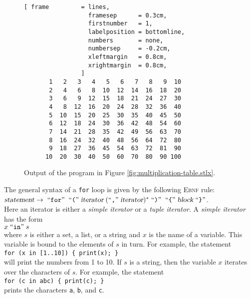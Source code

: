 \begin{figure}[!ht]
\centering
\begin{Verbatim}[ frame         = lines, 
                  framesep      = 0.3cm, 
                  firstnumber   = 1,
                  labelposition = bottomline,
                  numbers       = none,
                  numbersep     = -0.2cm,
                  xleftmargin   = 0.8cm,
                  xrightmargin  = 0.8cm,
                ]
       1   2   3   4   5   6   7   8   9  10
       2   4   6   8  10  12  14  16  18  20
       3   6   9  12  15  18  21  24  27  30
       4   8  12  16  20  24  28  32  36  40
       5  10  15  20  25  30  35  40  45  50
       6  12  18  24  30  36  42  48  54  60
       7  14  21  28  35  42  49  56  63  70
       8  16  24  32  40  48  56  64  72  80
       9  18  27  36  45  54  63  72  81  90
      10  20  30  40  50  60  70  80  90 100
\end{Verbatim}
\vspace*{-0.3cm}
\caption{Output of the program in Figure \ref{fig:multiplication-table.stlx}.}
\label{fig:multiplication-table}
\end{figure}

The general syntax of a \texttt{for} loop is given by the following \textsc{Ebnf} rule:
\\[0.2cm]
\hspace*{1.3cm}
$\textsl{statement} \rightarrow \;\mbox{``\texttt{for}''}\; \;\mbox{``\texttt{(}''}\; \textsl{iterator} \;(\mbox{``\texttt{,}''}\; \textsl{iterator})^* \;\mbox{``\texttt{)}''}\;
  \;\mbox{``\texttt{\{}''}\; \textsl{block} \;\mbox{``\texttt{\}}''}
$.
\\[0.2cm]
Here an iterator is either a \emph{simple iterator} or a \emph{tuple iterator}.  A
\emph{simple iterator} has the form
\\[0.2cm]
\hspace*{1.3cm}
$x \;\mbox{``\texttt{in}''}\; s$
\\[0.2cm]
where $s$ is either a set, a list, or a string and $x$ is the name of a variable.
This variable is bound to the elements of $s$ in turn.  For example,  the statement
\\[0.2cm]
\hspace*{1.3cm}
\texttt{for (x in [1..10]) \{ print(x); \}}
\\[0.2cm]
will print the numbers from 1 to 10.  If $s$ is a string, then the variable $x$ iterates over the
characters of $s$.  For example, the statement
\\[0.2cm]
\hspace*{1.3cm}
\texttt{for (c in abc) \{ print(c); \}}
\\[0.2cm]
prints the characters \texttt{a}, \texttt{b},
and \texttt{c}.  


